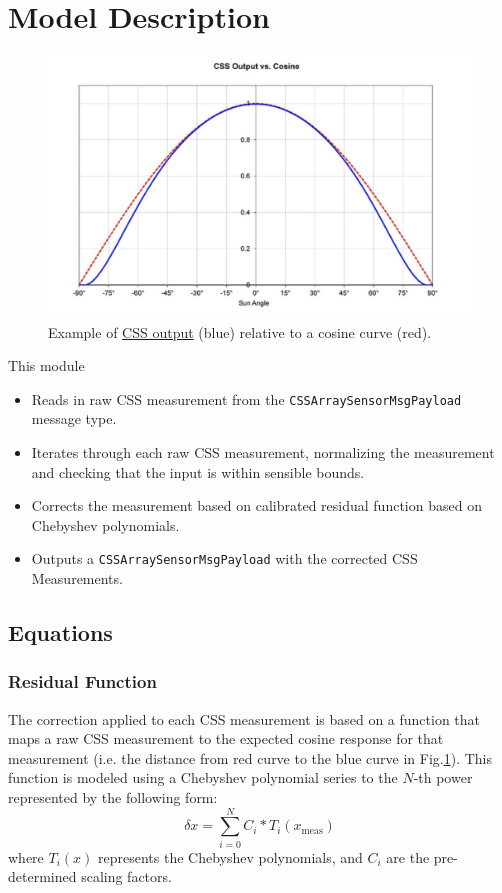 
\section{Model Description}

\begin{figure}[H]
	\centerline{
		\includegraphics[scale=0.5]{Figures/CSSCalibration}
	}
	\caption{Example of \href{https://lang.adcole.com/aerospace/analog-sun-sensors/coarse-sun-sensor-detector/}{CSS output} (blue) relative to a cosine curve (red)\cite{CSS}.}
	\label{fig:CSSraw}
\end{figure}

This module 
\begin{itemize}
\item Reads in raw CSS measurement from the \verb.CSSArraySensorMsgPayload. message type.
\item Iterates through each raw CSS measurement, normalizing the measurement and checking that the input is within sensible bounds.
\item Corrects the measurement based on calibrated residual function based on Chebyshev polynomials. 
\item Outputs a \verb.CSSArraySensorMsgPayload. with the corrected CSS Measurements.
\end{itemize}


\subsection{Equations}
\subsubsection{Residual Function}
The correction applied to each CSS measurement is based on a function that maps a raw CSS measurement to the expected cosine response for that measurement (i.e. the distance from red curve to the blue curve in Fig.\ref{fig:CSSraw}). This function is modeled using a Chebyshev polynomial series to the $N$-th power represented by the following form: 
\begin{equation}
\delta x = \sum_{i=0}^{N} C_i*T_i(x_{\text{meas}})
\end{equation}
 where $T_i(x)$ represents the Chebyshev polynomials, and $C_i$ are the pre-determined scaling factors. 

